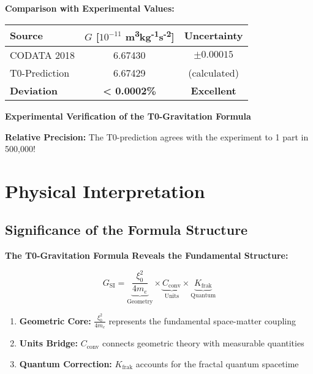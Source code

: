 \documentclass[12pt,a4paper]{article}
\begin{document}
	\begin{verification}
		\textbf{Comparison with Experimental Values:}
		
		\begin{center}
			\begin{tabular}{lcc}
				\toprule
				\textbf{Source} & \textbf{$G$ [$10^{-11}$ m\textsuperscript{3}kg\textsuperscript{-1}s\textsuperscript{-2}]} & \textbf{Uncertainty} \\
				\midrule
				CODATA 2018 & 6.67430 & $\pm 0.00015$ \\
				T0-Prediction & 6.67429 & (calculated) \\
				\textbf{Deviation} & \textbf{< 0.0002\%} & \textbf{Excellent} \\
				\bottomrule
			\end{tabular}
		\end{center}
		\textbf{Experimental Verification of the T0-Gravitation Formula}
		
		\textbf{Relative Precision:} The T0-prediction agrees with the experiment to 1 part in 500,000!
	\end{verification}
	
	\section{Physical Interpretation}
	
	\subsection{Significance of the Formula Structure}
	
	\begin{keyresult}
		\textbf{The T0-Gravitation Formula Reveals the Fundamental Structure:}
		
		\begin{equation}
			G_{\text{SI}} = \underbrace{\frac{\xi_0^2}{4 m_e}}_{\text{Geometry}} \times \underbrace{C_{\text{conv}}}_{\text{Units}} \times \underbrace{K_{\text{frak}}}_{\text{Quantum}}
		\end{equation}
		
		\begin{enumerate}
			\item \textbf{Geometric Core:} $\frac{\xi_0^2}{4 m_e}$ represents the fundamental space-matter coupling
			
			\item \textbf{Units Bridge:} $C_{\text{conv}}$ connects geometric theory with measurable quantities
			
			\item \textbf{Quantum Correction:} $K_{\text{frak}}$ accounts for the fractal quantum spacetime
		\end{enumerate}
	\end{keyresult}
	
\end{document}
